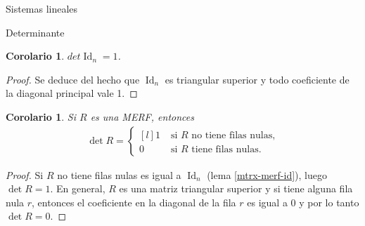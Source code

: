 \documentclass[a4paper,12pt,twoside,spanish,reqno]{amsbook}
\newtheorem{corolario}[teorema]{Corolario}
\theoremstyle{definition}
\theoremstyle{remark}
\newcommand{\Id}{\operatorname{Id}}
\begin{document}
\begin{chapter}{Sistemas lineales}
\begin{section}{Determinante}
	\begin{corolario}
		$det \Id_n = 1$.
	\end{corolario}
	\begin{proof}
		Se deduce del hecho que $\Id_n$  es triangular superior y todo coeficiente de la diagonal principal vale 1.
	\end{proof}
	
	\begin{corolario}
		Si $R$ es una MERF, entonces 
		\begin{align*}
		\det R = \left\{ \begin{matrix*}[l]
		1 \;&\text{si $R$ no tiene filas nulas,}\\
		0&\text{si $R$ tiene filas nulas.}
		\end{matrix*}\right.  
		\end{align*}
	\end{corolario}
	\begin{proof}
		Si $R$ no tiene filas nulas es igual a $\Id_n$ (lema \ref{mtrx-merf-id}), luego $\det R = 1$. En general, $R$ es una matriz triangular superior y si tiene alguna fila nula $r$, entonces el coeficiente en la diagonal de la fila $r$ es igual a $0$ y por lo tanto 	$\det R = 0$.
	\end{proof}


\end{section}
\end{chapter}
\end{document}
